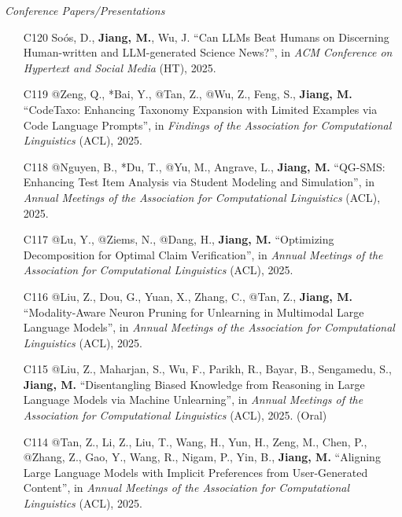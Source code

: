 \documentclass[10pt]{article}
\newenvironment{myindentpar}[1]%
{\begin{list}{}%
         {\setlength{\leftmargin}{#1}}%
         \item[]%
}
{\end{list}}
\newcounter{list}
\begin{document}
\begin{myindentpar}{0.00cm}

\hspace{-0.25cm}\textit{Conference Papers/Presentations}

\begin{enumerate}[leftmargin=.5cm]

\item[C120] Soós, D., \textbf{Jiang, M.}, Wu, J. ``Can LLMs Beat Humans on Discerning Human-written and LLM-generated Science News?'', in \textit{ACM Conference on Hypertext and Social Media} (HT), 2025.

\item[C119] @Zeng, Q., *Bai, Y., @Tan, Z., @Wu, Z., Feng, S., \textbf{Jiang, M.} ``CodeTaxo: Enhancing Taxonomy Expansion with Limited Examples via Code Language Prompts'', in \textit{Findings of the Association for Computational Linguistics} (ACL), 2025.

\item[C118] @Nguyen, B., *Du, T., @Yu, M., Angrave, L., \textbf{Jiang, M.} ``QG-SMS: Enhancing Test Item Analysis via Student Modeling and Simulation'', in \textit{Annual Meetings of the Association for Computational Linguistics} (ACL), 2025.

\item[C117] @Lu, Y., @Ziems, N., @Dang, H., \textbf{Jiang, M.} ``Optimizing Decomposition for Optimal Claim Verification'', in \textit{Annual Meetings of the Association for Computational Linguistics} (ACL), 2025.

\item[C116] @Liu, Z., Dou, G., Yuan, X., Zhang, C., @Tan, Z., \textbf{Jiang, M.} ``Modality-Aware Neuron Pruning for Unlearning in Multimodal Large Language Models'', in \textit{Annual Meetings of the Association for Computational Linguistics} (ACL), 2025.

\item[C115] @Liu, Z., Maharjan, S., Wu, F., Parikh, R., Bayar, B., Sengamedu, S., \textbf{Jiang, M.} ``Disentangling Biased Knowledge from Reasoning in Large Language Models via Machine Unlearning'', in \textit{Annual Meetings of the Association for Computational Linguistics} (ACL), 2025. (Oral)

\item[C114] @Tan, Z., Li, Z., Liu, T., Wang, H., Yun, H., Zeng, M., Chen, P., @Zhang, Z., Gao, Y., Wang, R., Nigam, P., Yin, B., \textbf{Jiang, M.} ``Aligning Large Language Models with Implicit Preferences from User-Generated Content'', in \textit{Annual Meetings of the Association for Computational Linguistics} (ACL), 2025.


\end{enumerate}
\end{myindentpar}
\end{document}
